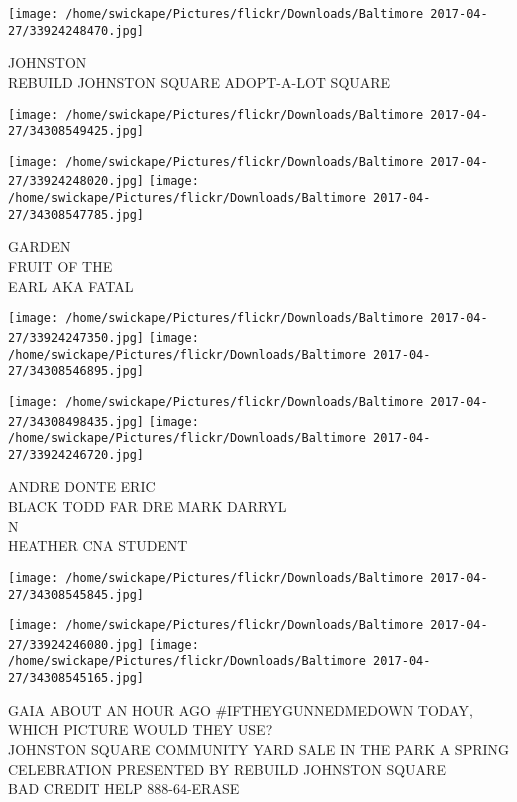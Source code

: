 \documentclass[10pt,letterpaper]{article}
\begin{document}
\vspace{0.25in}
\texttt{[image: /home/swickape/Pictures/flickr/Downloads/Baltimore 2017-04-27/33924248470.jpg]}

JOHNSTON\\
REBUILD JOHNSTON SQUARE ADOPT{-}A{-}LOT SQUARE\\
\pagebreak

\texttt{[image: /home/swickape/Pictures/flickr/Downloads/Baltimore 2017-04-27/34308549425.jpg]}

\vspace{0.25in}
\texttt{[image: /home/swickape/Pictures/flickr/Downloads/Baltimore 2017-04-27/33924248020.jpg]}
\texttt{[image: /home/swickape/Pictures/flickr/Downloads/Baltimore 2017-04-27/34308547785.jpg]}

GARDEN\\
FRUIT OF THE\\
EARL AKA FATAL\\
\pagebreak

\texttt{[image: /home/swickape/Pictures/flickr/Downloads/Baltimore 2017-04-27/33924247350.jpg]}
\texttt{[image: /home/swickape/Pictures/flickr/Downloads/Baltimore 2017-04-27/34308546895.jpg]}

\texttt{[image: /home/swickape/Pictures/flickr/Downloads/Baltimore 2017-04-27/34308498435.jpg]}
\texttt{[image: /home/swickape/Pictures/flickr/Downloads/Baltimore 2017-04-27/33924246720.jpg]}

ANDRE DONTE ERIC\\
BLACK TODD FAR DRE MARK DARRYL\\
N\\
HEATHER CNA STUDENT\\
\pagebreak

\texttt{[image: /home/swickape/Pictures/flickr/Downloads/Baltimore 2017-04-27/34308545845.jpg]}

\vspace{0.25in}
\texttt{[image: /home/swickape/Pictures/flickr/Downloads/Baltimore 2017-04-27/33924246080.jpg]}
\texttt{[image: /home/swickape/Pictures/flickr/Downloads/Baltimore 2017-04-27/34308545165.jpg]}

GAIA ABOUT AN HOUR AGO \#IFTHEYGUNNEDMEDOWN TODAY, WHICH PICTURE WOULD THEY USE?\\
JOHNSTON SQUARE COMMUNITY YARD SALE IN THE PARK A SPRING CELEBRATION PRESENTED BY REBUILD JOHNSTON SQUARE\\
BAD CREDIT HELP 888{-}64{-}ERASE\\
\pagebreak
\end{document}
